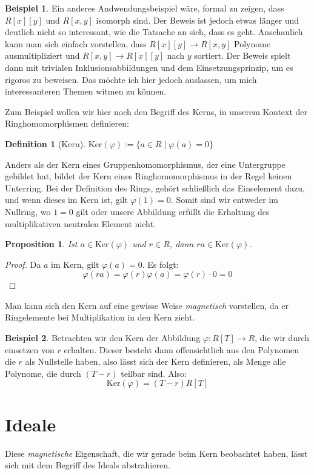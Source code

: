 \documentclass{article}
\newtheorem*{prop}{Proposition}
\theoremstyle{definition}
\newtheorem*{definition}{Definition}
\newtheorem*{zb}{Beispiel}
\theoremstyle{remark}
\begin{document}
\begin{zb}
Ein anderes Andwendungsbeispiel wäre, formal zu zeigen, dass $R[x][y]$ und $R[x,y]$ isomorph sind. Der Beweis
ist jedoch etwas länger und deutlich nicht so interessant, wie die Tatsache an sich, dass es geht. Anschaulich
kann man sich einfach vorstellen, dass $R[x][y]\to R[x,y]$ Polynome ausmultipliziert und
$R[x,y]\to R[x][y]$ nach $y$ sortiert. Der Beweis spielt dann mit trivialen Inklusionsabbildungen und dem
Einsetzungsprinzip, um es rigoros zu beweisen. Das möchte ich hier jedoch auslassen, um mich interessanteren
Themen witmen zu können.
\end{zb}

Zum Beispiel wollen wir hier noch den Begriff des Kerns, in unserem Kontext der Ringhomomorphismen definieren:
\begin{definition}[Kern]
    $\mathrm{Ker}(\varphi) := \{a\in R \mid \varphi(a)=0\}$
\end{definition}

Anders als der Kern eines Gruppenhomomorphismus, der eine Untergruppe gebildet hat, bildet der Kern eines
Ringhomomorphismus in der Regel keinen Unterring. Bei der Definition des Rings, gehört schließlich das
Einselement dazu, und wenn dieses im Kern ist, gilt $\varphi(1)=0$. Somit sind wir entweder im Nullring, wo
$1=0$ gilt oder unsere Abbildung erfüllt die Erhaltung des multiplikativen neutralen Element nicht.

\begin{prop} Ist $a\in \mathrm{Ker}(\varphi)$ und $r\in R$, dann $ra\in \mathrm{Ker}(\varphi)$.\end{prop}
\begin{proof} Da $a$ im Kern, gilt $\varphi(a)=0$. Es folgt:
    \[\varphi(ra)=\varphi(r)\varphi(a)=\varphi(r)\cdot0=0\]
\end{proof}
Man kann sich den Kern auf eine gewisse Weise \emph{magnetisch} vorstellen, da er Ringelemente bei
Multiplikation in den Kern zieht.

\begin{zb}
Betrachten wir den Kern der Abbildung $\varphi: R[T]\to R$, die wir durch einsetzen von $r$ erhalten. Dieser
besteht dann offensichtlich aus den Polynomen die $r$ als Nullstelle haben, also lässt sich der Kern
definieren, als Menge alle Polynome, die durch $(T-r)$ teilbar sind. Also:
\[\mathrm{Ker}(\varphi)=(T-r)R[T]\]
\end{zb}

\newpage
\section{Ideale}
Diese \emph{magnetische} Eigenschaft, die wir gerade beim Kern beobachtet haben, lässt sich mit dem Begriff
des Ideals abstrahieren.
\end{document}
